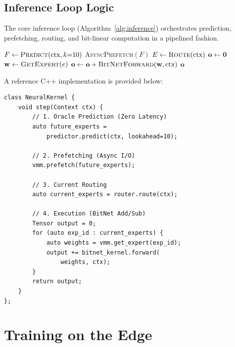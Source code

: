 \documentclass[11pt,twocolumn]{article}
\begin{document}
\subsection{Inference Loop Logic}

The core inference loop (Algorithm~\ref{alg:inference}) orchestrates prediction, prefetching, routing, and bit-linear computation in a pipelined fashion.

\begin{algorithm}[h]
\caption{NeuralOS Inference Step}\label{alg:inference}
\begin{algorithmic}[1]
    \State $F \gets \textsc{Predict}(\text{ctx}, k{=}10)$ 
    \State \textsc{AsyncPrefetch}$(F)$ 
    \State $E \gets \textsc{Route}(\text{ctx})$ 
    \State $\mathbf{o} \gets \mathbf{0}$
        \State $\mathbf{w} \gets \textsc{GetExpert}(e)$ 
        \State $\mathbf{o} \gets \mathbf{o} + \textsc{BitNetForward}(\mathbf{w}, \text{ctx})$
    \EndFor
    \State \Return $\mathbf{o}$
\EndProcedure
\end{algorithmic}
\end{algorithm}

\noindent A reference C++ implementation is provided below:

\begin{lstlisting}[style=cppstyle, caption={NeuralKernel inference loop.}]
class NeuralKernel {
    void step(Context ctx) {
        // 1. Oracle Prediction (Zero Latency)
        auto future_experts =
            predictor.predict(ctx, lookahead=10);

        // 2. Prefetching (Async I/O)
        vmm.prefetch(future_experts);

        // 3. Current Routing
        auto current_experts = router.route(ctx);

        // 4. Execution (BitNet Add/Sub)
        Tensor output = 0;
        for (auto exp_id : current_experts) {
            auto weights = vmm.get_expert(exp_id);
            output += bitnet_kernel.forward(
                weights, ctx);
        }
        return output;
    }
};
\end{lstlisting}

\section{Training on the Edge}
\end{document}
